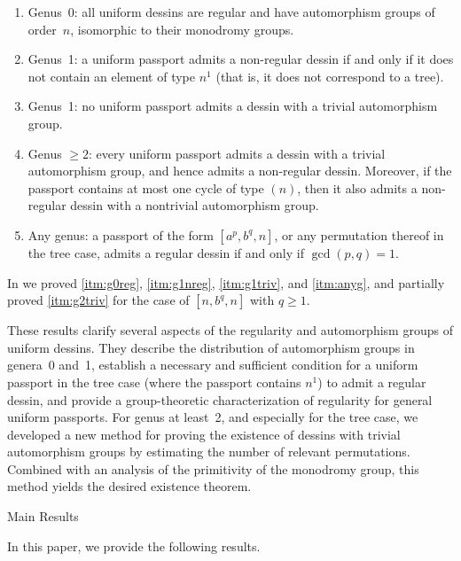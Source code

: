 \documentclass[12pt,reqno]{amsart}
\makeatletter
\newif\if@noindentafterheading
\renewcommand\subsection{\@startsection{subsection}{2}{\z@}%
  {-2.5ex \@plus -.3ex \@minus -.2ex}%
  {1.5ex \@plus .2ex}%
  {\normalfont\bfseries}%
}
\let\orig@subsection\subsection
\renewcommand\subsection{%
  \@ifstar{\subsection@star}{\subsection@nostar}%
}
\newcommand\subsection@nostar{%
  \@ifnextchar[{\subsection@opt}{\subsection@noopt}%
}
\newcommand\subsection@opt[2][]{%
  \global\@noindentafterheadingtrue
  \orig@subsection[#1]{#2}%
  \global\@noindentafterheadingfalse
}
\newcommand\subsection@noopt[1]{%
  \global\@noindentafterheadingtrue
  \orig@subsection{#1}%
  \global\@noindentafterheadingfalse
}
\newcommand\subsection@star[1]{%
  \global\@noindentafterheadingtrue
  \orig@subsection*{#1}%
  \global\@noindentafterheadingfalse
}
\theoremstyle{mythmstyle}
\theoremstyle{mydefstyle}
\numberwithin{equation}{section}
\makeatother
\begin{document}
\begin{enumerate}
\item\label{itm:g0reg} Genus~0: all uniform dessins are regular and have automorphism groups of order~$n$,
isomorphic to their monodromy groups.
\item\label{itm:g1nreg} Genus~1: a uniform passport admits a non-regular dessin if and only if it does not contain
an element of type $n^{1}$ (that is, it does not correspond to a tree).
\item\label{itm:g1triv} Genus~1: no uniform passport admits a dessin with a trivial automorphism group.
\item\label{itm:g2triv} Genus $\ge 2$: every uniform passport admits a dessin with a trivial automorphism group, and hence admits
a non-regular dessin.
Moreover, if the passport contains at most one cycle of type $(n)$, then it also admits a non-regular dessin with
a nontrivial automorphism group.
\item\label{itm:anyg} Any genus: a passport of the form $[a^{p}, b^{q}, n]$, or any permutation thereof in the tree case, admits a regular dessin if and only if $\gcd(p, q) = 1$.
\end{enumerate}

In \cite{Ohnishi26} we proved \ref{itm:g0reg}, \ref{itm:g1nreg}, \ref{itm:g1triv}, and \ref{itm:anyg},
and partially proved \ref{itm:g2triv} for the case of $[n, b^{q}, n]$ with $q \ge 1$.

These results clarify several aspects of the regularity and automorphism groups of uniform dessins.
They describe the distribution of automorphism groups in genera~0 and~1, establish a necessary and sufficient
condition for a uniform passport in the tree case  (where the passport contains $n^{1}$) to admit a regular dessin,
and provide a group-theoretic characterization of regularity for general uniform passports. For genus at least~2,
and especially for the tree case, we developed a new method for proving the existence of dessins with trivial
automorphism groups by estimating the number of relevant permutations. Combined with an analysis of the
primitivity of the monodromy group, this method yields the desired existence theorem.

\subsection{Main Results}

In this paper, we provide the following results.
\end{document}

